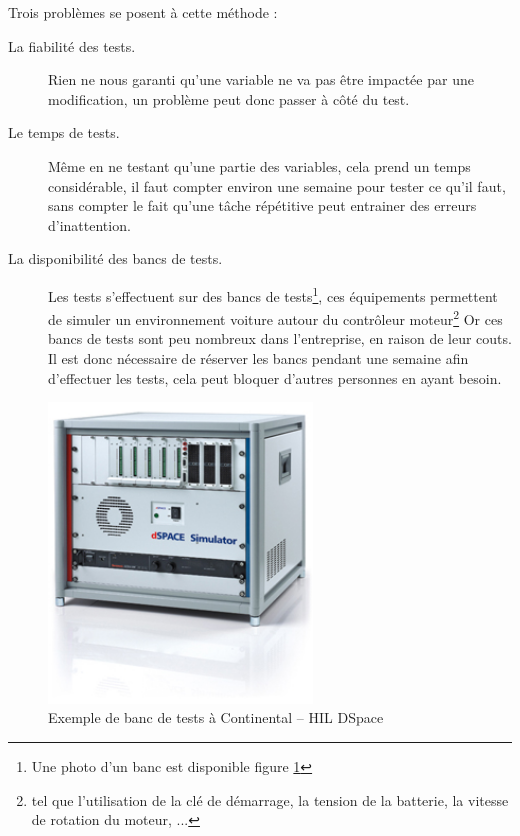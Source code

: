 	Trois problèmes se posent à cette méthode : 
	\begin{description}
		\item[La fiabilité des tests.] Rien ne nous garanti qu'une variable ne va pas être impactée par une modification, un problème peut donc passer à côté du test.
		\item[Le temps de tests.] Même en ne testant qu'une partie des variables, cela prend un temps considérable, il faut compter environ une semaine pour tester ce qu'il faut, sans compter le fait qu'une tâche répétitive peut entrainer des erreurs d'inattention.
		\item[La disponibilité des bancs de tests.]	Les tests s'effectuent sur des bancs de tests\footnote{Une photo d'un banc est disponible figure \ref{fig:photoHil}}, ces équipements permettent de simuler un environnement voiture autour du contrôleur moteur\footnote{tel que l'utilisation de la clé de démarrage, la tension de la batterie, la vitesse de rotation du moteur, ...} Or ces bancs de tests sont peu nombreux dans l'entreprise, en raison de leur couts. Il est donc nécessaire de réserver les bancs pendant une semaine afin d'effectuer les tests, cela peut bloquer d'autres personnes en ayant besoin.
	\end{description}
	\begin{figure}[H]
		\centering
		\includegraphics[width=7cm]{contents/images/hil.jpg}
		\caption{Exemple de banc de tests à Continental -- HIL DSpace}
		\label{fig:photoHil}
	\end{figure}


